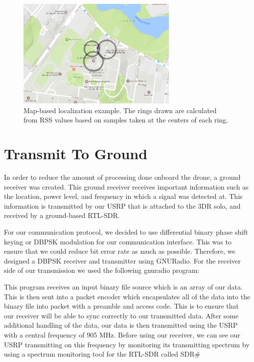 \begin{figure}[ht]
\centering
\includegraphics[width=0.70\textwidth]{img/localization_map_visualization.png}
\caption{Map-based localization example. The rings drawn are calculated from RSS values based on samples taken at the centers of each ring.}
\label{fig:map_localize}
\end{figure}

\section{Transmit To Ground}

In order to reduce the amount of processing done onboard the drone, a ground receiver was created.  This ground receiver receives important information such as the location, power level, and frequency in which a signal was detected at.  This information is transmitted by our USRP that is attached to 
the 3DR solo, and received by a ground-based RTL-SDR.  

For our communication protocol, we decided to use differential binary phase shift keying or DBPSK modulation for our communication interface.  This was to ensure that we could reduce bit error rate as much as possible.  Therefore, we designed a DBPSK receiver and transmitter using GNURadio. For the receiver side of our transmission we used the following gnuradio program:

This program receives an input binary file source which is an array of our data.  This is then sent into a packet encoder which encapsulates all of the data into the binary file into packet with a preamble and access code.  This is to ensure that our receiver will be able to sync correctly to our transmitted data.  After some additional handling of the data, our data is then transmitted using the USRP with a central frequency of 905 MHz.  Before using our receiver, we can see our USRP transmitting on this frequency by monitoring its transmitting spectrum by using a spectrum monitoring tool for the RTL-SDR called SDR\#

